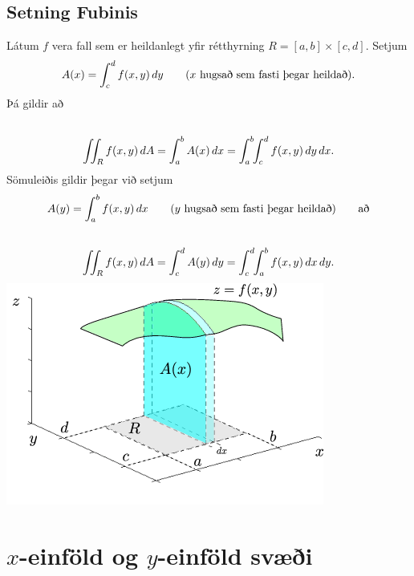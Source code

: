 \documentclass[a4paper,10pt,icelandic]{sphinxmanual}
\begin{document}
\subsection{Setning Fubinis}
\label{Kafli4:setning-fubinis}
Látum \(f\) vera fall sem er heildanlegt yfir rétthyrning
\(R=[a,b]\times
[c,d]\). Setjum
\begin{gather}
\begin{split}\displaystyle A(x)=\int_c^d f(x,y)\,dy\qquad\mbox{($x$ hugsað sem fasti þegar heildað)}.\end{split}\notag
\end{gather}
Þá gildir að
\begin{gather}
\begin{split}\displaystyle\end{split}\notag\\\begin{split}\int\!\!\!\int_R f(x,y)\,dA=\int_a^b A(x)\,dx=\int_a^b\!\!\int_c^d
f(x,y)\,dy\,dx.\end{split}\notag
\end{gather}
Sömuleiðis gildir þegar við setjum
\begin{gather}
\begin{split}\displaystyle A(y)=\int_a^b f(x,y)\,dx\qquad\mbox{($y$ hugsað sem fasti þegar heildað)} \qquad \text{að}\end{split}\notag
\end{gather}\begin{gather}
\begin{split}\displaystyle\end{split}\notag\\\begin{split}\int\!\!\!\int_R f(x,y)\,dA=\int_c^d A(y)\,dy=\int_c^d\!\!\int_a^b
f(x,y)\,dx\,dy.\end{split}\notag
\end{gather}
{\hfill\includegraphics[width=0.500\linewidth]{ax1.png}\hfill}


\section{\(x\)-einföld og \(y\)-einföld svæði}
\label{Kafli4:einfold-og-einfold-svaei}
\end{document}
